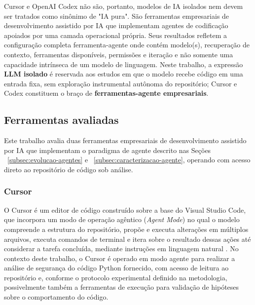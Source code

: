 Cursor e OpenAI Codex não são, portanto, modelos de IA isolados nem devem ser tratados como sinônimo de "IA pura". São ferramentas empresariais de desenvolvimento assistido por IA que implementam agentes de codificação apoiados por uma camada operacional própria. Seus resultados refletem a configuração completa ferramenta-agente onde contém modelo(s), recuperação de contexto, ferramentas disponíveis, permissões e iteração  e não somente uma capacidade intrínseca de um modelo de linguagem. Neste trabalho, a expressão \textbf{LLM isolado} é reservada aos estudos em que o modelo recebe código em uma entrada fixa, sem exploração instrumental autônoma do repositório; Cursor e Codex constituem o braço de \textbf{ferramentas-agente empresariais}.

\subsection{Ferramentas avaliadas}\label{subsec:ferramentas-agentes}
Este trabalho avalia duas ferramentas empresariais de desenvolvimento assistido por IA que implementam o paradigma de agente descrito nas Seções ~\ref{subsec:evolucao-agentes} e ~\ref{subsec:caracterizacao-agente}, operando com acesso direto ao repositório de código sob análise.

\subsubsection{Cursor}\label{subsubsec:cursor}
O Cursor é um editor de código construído sobre a base do Visual Studio Code, que incorpora um modo de operação agêntico (\textit{Agent Mode}) no qual o modelo compreende a estrutura do repositório, propõe e executa alterações em múltiplos arquivos, executa comandos de terminal e itera sobre o resultado dessas ações até considerar a tarefa concluída, mediante instruções em linguagem natural \cite{Cursor2025Docs}. No contexto deste trabalho, o Cursor é operado em modo agente para realizar a análise de segurança do código Python fornecido, com acesso de leitura ao repositório e, conforme o protocolo experimental definido na metodologia, possivelmente também a ferramentas de execução para validação de hipóteses sobre o comportamento do código.

